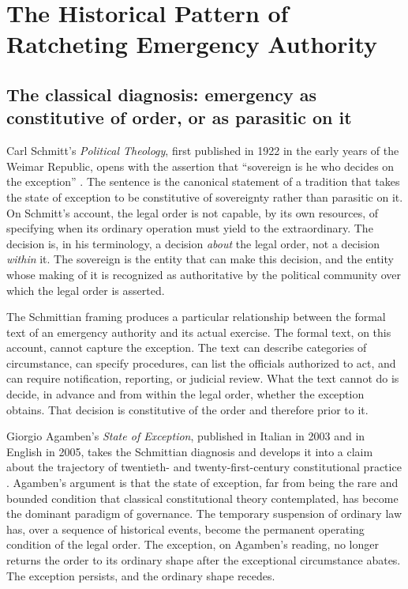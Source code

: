\section{The Historical Pattern of Ratcheting Emergency Authority}
\label{sec:pattern}

\subsection{The classical diagnosis: emergency as constitutive of order, or as parasitic on it}

Carl Schmitt's \emph{Political Theology}, first published in 1922 in the early years of the Weimar Republic,
opens with the assertion that ``sovereign is he who decides on the exception''
\cite{ref_schmitt_political_theology}.
The sentence is the canonical statement of a tradition that takes the state of exception to be
constitutive of sovereignty rather than parasitic on it.
On Schmitt's account, the legal order is not capable, by its own resources,
of specifying when its ordinary operation must yield to the extraordinary.
The decision is, in his terminology, a decision \emph{about} the legal order,
not a decision \emph{within} it.
The sovereign is the entity that can make this decision, and the entity whose making of it is recognized
as authoritative by the political community over which the legal order is asserted.

The Schmittian framing produces a particular relationship between the formal text of an emergency authority
and its actual exercise.
The formal text, on this account, cannot capture the exception.
The text can describe categories of circumstance, can specify procedures, can list the officials authorized to act,
and can require notification, reporting, or judicial review.
What the text cannot do is decide, in advance and from within the legal order,
whether the exception obtains.
That decision is constitutive of the order and therefore prior to it.

Giorgio Agamben's \emph{State of Exception}, published in Italian in 2003 and in English in 2005,
takes the Schmittian diagnosis and develops it into a claim about the trajectory of twentieth- and
twenty-first-century constitutional practice \cite{ref_agamben_state_of_exception}.
Agamben's argument is that the state of exception, far from being the rare and bounded condition that
classical constitutional theory contemplated, has become the dominant paradigm of governance.
The temporary suspension of ordinary law has, over a sequence of historical events,
become the permanent operating condition of the legal order.
The exception, on Agamben's reading, no longer returns the order to its ordinary shape after the
exceptional circumstance abates.
The exception persists, and the ordinary shape recedes.

